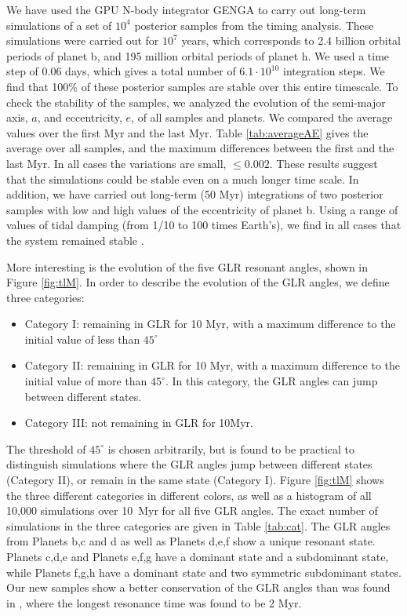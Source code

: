 \documentclass[twocolumn]{aastex63}
\begin{document}
We have used the GPU N-body integrator GENGA \citep{Grimm2014} to carry out long-term simulations of a set of $10^4$ posterior samples from the timing analysis.  These simulations were carried out for $10^7$ years, which corresponds to 2.4 billion orbital periods of planet b, and 195 million orbital periods of planet h. We used a time step of 0.06 days, which gives a total number of $6.1 \cdot 10^{10}$ integration steps. We find that 100\% of these posterior samples are stable over this entire timescale. %
To check the stability of the samples, we analyzed the evolution of the semi-major axis, $a$, and eccentricity, $e$, of all samples and planets. We compared the average values over the first Myr and the last Myr. Table \ref{tab:averageAE} gives the average over all samples, and the maximum differences between the first and the last Myr.  In all cases the variations are small, ${\le}0.002$.  These results suggest that the simulations could be stable even on a much longer time scale. In addition, we have carried out long-term (50 Myr) integrations of two posterior samples with low and high values of the eccentricity of planet b. Using a range of values of tidal damping (from 1/10 to 100 times Earth's), we find in all cases that the system remained stable \citep[using Posidonius;][]{Bolmont2020}.

More interesting is the evolution of the five GLR resonant angles, shown in Figure \ref{fig:tlM}. In order to describe the evolution of the GLR angles, we define three categories: 
\begin{itemize}
    \item Category I: remaining in GLR for 10 Myr, with a maximum difference to the initial value of less than $45^\circ$
    \item Category II: remaining in GLR for 10 Myr, with a maximum difference to the initial value of more than $45^\circ$. In this category, the GLR angles can jump between different states. 
    \item Category III: not remaining in GLR for 10Myr. 
\end{itemize}
The threshold of $45^\circ$ is chosen arbitrarily, but is found to be practical to distinguish simulations where the GLR angles jump between different states (Category II), or remain in the same state (Category I). Figure \ref{fig:tlM} shows the three different categories in different colors, as well as a histogram of all 10,000 simulations over 10~Myr for all five GLR angles.  The exact number of simulations in the three categories are given in Table \ref{tab:cat}. The GLR angles from Planets b,c and d as well as Planets d,e,f show a unique resonant state. Planets c,d,e and Planets e,f,g have a dominant state and a subdominant state, while Planets f,g,h have a dominant state and two symmetric subdominant states.
Our new samples show a better conservation of the GLR angles than was found in \citep{Grimm2018}, where the longest resonance time was found to be 2 Myr. 
\end{document}
